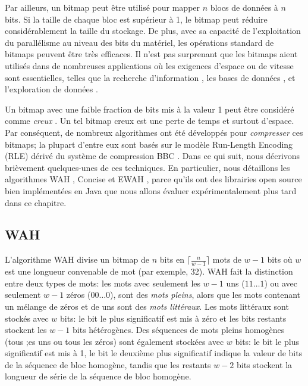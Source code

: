 Par ailleurs, un bitmap peut être utilisé pour mapper $n$ blocs de données à $n$ bits. Si la taille de chaque bloc est supérieur à 1, le bitmap peut réduire considérablement la taille du stockage. De plus, avec sa capacité de l'exploitation du parallélisme au niveau des bits du matériel, les opérations standard de bitmaps peuvent être très efficaces. Il n'est pas surprenant que les bitmaps aient utilisés dans de nombreuses applications où les exigences d'espace ou de vitesse sont essentielles, telles que la recherche d'information \citep{Chan:1998:BID:276305.276336}, les bases de données \citep{burdick2001mafia}, et l'exploration de données \citep{Ayres:2002:SPM:775047.775109,Uno:2005:LVC:1133905.1133916}.

Un bitmap avec une faible fraction de bits mis à la valeur 1 peut être considéré comme \emph{creux} \citep{lemire2014}. Un tel bitmap creux est une perte de temps et surtout d'espace. Par conséquent, de nombreux algorithmes ont été développés pour \emph{compresser} ces bitmaps; la plupart d'entre eux sont basés sur le modèle Run-Length Encoding (RLE) dérivé du système de compression BBC \citep{antoshenkov1995byte}. Dans ce qui suit, nous décrivons brièvement quelques-unes de ces techniques. En particulier, nous détaillons les algorithmes WAH \citep{wu2006optimizing}, Concise \citep{colantonio2010} et EWAH \citep{lemire2010}, parce qu'ils ont des librairies open source bien implémentées en Java que nous allons évaluer expérimentalement plus tard dans ce chapitre.

\subsection{WAH}

L'algorithme WAH \citep{wu2006optimizing} divise un bitmap de $n$ bits en $\lceil \frac{n}{w-1}\rceil$ mots de $w-1$ bits où $w$ est une longueur convenable de mot (par exemple, 32). WAH fait la distinction entre deux types de mots: les mots avec seulement les $w-1$ uns ($11\dots 1$) ou avec seulement $w-1$ zéros ($00\dots 0$), sont des \emph{mots pleins}, alors que les mots contenant un mélange de zéros et de uns sont des \emph{mots littéraux}. Les mots littéraux sont stockés avec $w$ bits: le bit le plus significatif est mis à zéro et les bits restants stockent les $w-1$ bits hétérogènes. Des séquences de mots pleins homogènes (tous ;es uns ou tous les zéros) sont également stockées avec $w$ bits: le bit le plus significatif est mis à 1, le bit le deuxième plus significatif indique la valeur de bits de la séquence de bloc homogène, tandis que les restants $w-2$ bits stockent la longueur de série de la séquence de bloc homogène.

